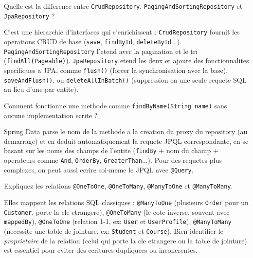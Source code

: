\documentclass[11pt,a4paper]{article}
\begin{document}
\begin{question} Quelle est la difference entre \texttt{CrudRepository}, \texttt{PagingAndSortingRepository} et \texttt{JpaRepository} ?
\end{question}
\begin{reponse}
C'est une hierarchie d'interfaces qui s'enrichissent : \texttt{CrudRepository} fournit les operations CRUD de base (\texttt{save}, \texttt{findById}, \texttt{deleteById}...). \texttt{PagingAndSortingRepository} l'etend avec la pagination et le tri (\texttt{findAll(Pageable)}). \texttt{JpaRepository} etend les deux et ajoute des fonctionnalites specifiques a JPA, comme \texttt{flush()} (forcer la synchronisation avec la base), \texttt{saveAndFlush()}, ou \texttt{deleteAllInBatch()} (suppression en une seule requete SQL au lieu d'une par entite).
\end{reponse}

\begin{question} Comment fonctionne une methode comme \texttt{findByName(String name)} sans aucune implementation ecrite ?
\end{question}
\begin{reponse}
Spring Data parse le nom de la methode a la creation du proxy du repository (au demarrage) et en deduit automatiquement la requete JPQL correspondante, en se basant sur les noms des champs de l'entite (\texttt{findBy} + nom du champ + operateurs comme \texttt{And}, \texttt{OrderBy}, \texttt{GreaterThan}...). Pour des requetes plus complexes, on peut aussi ecrire soi-meme le JPQL avec \texttt{@Query}.
\end{reponse}

\begin{question} Expliquez les relations \texttt{@OneToOne}, \texttt{@OneToMany}, \texttt{@ManyToOne} et \texttt{@ManyToMany}.
\end{question}
\begin{reponse}
Elles mappent les relations SQL classiques : \texttt{@ManyToOne} (plusieurs \texttt{Order} pour un \texttt{Customer}, porte la cle etrangere), \texttt{@OneToMany} (le cote inverse, souvent avec \texttt{mappedBy}), \texttt{@OneToOne} (relation 1-1, ex: \texttt{User} et \texttt{UserProfile}), \texttt{@ManyToMany} (necessite une table de jointure, ex: \texttt{Student} et \texttt{Course}). Bien identifier le \emph{proprietaire} de la relation (celui qui porte la cle etrangere ou la table de jointure) est essentiel pour eviter des ecritures dupliquees ou incoherentes.
\end{reponse}
\end{document}
